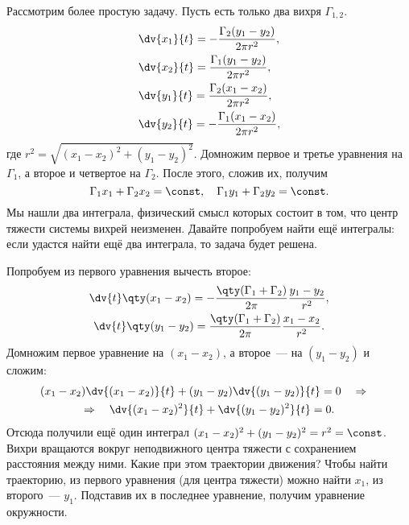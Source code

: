


Рассмотрим более простую задачу. Пусть есть только два вихря $\Gamma_{1,2}$.
\begin{equation}
	\begin{aligned}
	&\dv{x_1}{t}=-\frac{\Gamma_2 (y_1-y_2)}{2\pi r^2},\\
	&\dv{x_2}{t}=\frac{\Gamma_1 (y_1-y_2)}{2\pi r^2},\\
	&\dv{y_1}{t}=\frac{\Gamma_2 (x_1-x_2)}{2\pi r^2}, \\
	&\dv{y_2}{t}=-\frac{\Gamma_1 (x_1-x_2)}{2\pi r^2},
	\end{aligned}
\end{equation}
где $r^2=\sqrt{(x_1-x_2)^2+(y_1-y_2)^2}$.
Домножим первое и третье уравнения на $\Gamma_1$, а второе и четвертое на $\Gamma_2$. После этого, сложив их, получим
\begin{equation}
	\Gamma_1 x_1 + \Gamma_2 x_2=\const, \quad
	\Gamma_1 y_1 + \Gamma_2 y_2=\const.
\end{equation}
Мы нашли два интеграла, физический смысл которых состоит в том, что центр тяжести системы вихрей неизменен. Давайте попробуем найти ещё интегралы: если удастся найти ещё два интеграла, то задача будет решена.

Попробуем из первого уравнения вычесть второе:
\begin{gather}
	\dv{t}\qty(x_1-x_2)=-\frac{\qty(\Gamma_1+ \Gamma_2)}{2\pi}\frac{y_1-y_2}{r^2},\\
	\dv{t}\qty(y_1-y_2)=\frac{\qty(\Gamma_1+ \Gamma_2)}{2\pi}\frac{x_1-x_2}{r^2}.
\end{gather}
Домножим первое уравнение на $(x_1-x_2)$, а второе~--- на $(y_1-y_2)$ и сложим:
\begin{gather}
	(x_1-x_2)\dv{(x_1-x_2)}{t}+(y_1-y_2)\dv{(y_1-y_2)}{t}=0 \quad \Rightarrow \quad \\ \Rightarrow\quad
	\dv{(x_1-x_2)^2}{t}+\dv{(y_1-y_2)^2}{t}=0.
\end{gather}
Отсюда получили ещё один интеграл $(x_1-x_2)^2+(y_1-y_2)^2=r^2=\const$. Вихри вращаются вокруг неподвижного центра тяжести с сохранением расстояния между ними. Какие при этом траектории движения? Чтобы найти траекторию, из первого уравнения (для центра тяжести) можно найти $x_1$, из второго~--- $y_1$.  Подставив их в последнее уравнение, получим уравнение окружности.


